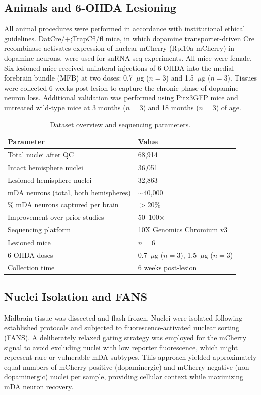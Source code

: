 \documentclass[12pt]{article}
\begin{document}
\subsection{Animals and 6-OHDA Lesioning}

All animal procedures were performed in accordance with institutional ethical guidelines. DatCre/+;TrapCfl/fl mice, in which dopamine transporter-driven Cre recombinase activates expression of nuclear mCherry (Rpl10a-mCherry) in dopamine neurons, were used for snRNA-seq experiments. All mice were female. Six lesioned mice received unilateral injections of 6-OHDA into the medial forebrain bundle (MFB) at two doses: 0.7~$\mu$g ($n = 3$) and 1.5~$\mu$g ($n = 3$). Tissues were collected 6 weeks post-lesion to capture the chronic phase of dopamine neuron loss. Additional validation was performed using Pitx3GFP mice and untreated wild-type mice at 3 months ($n = 3$) and 18 months ($n = 3$) of age.

\begin{table}[ht]
\centering
\caption{Dataset overview and sequencing parameters.}
\label{tab:dataset}
\begin{tabular}{ll}
\toprule
Parameter & Value \\
\midrule
Total nuclei after QC & 68,914 \\
Intact hemisphere nuclei & 36,051 \\
Lesioned hemisphere nuclei & 32,863 \\
mDA neurons (total, both hemispheres) & $\sim$40,000 \\
\% mDA neurons captured per brain & $>$20\% \\
Improvement over prior studies & 50--100$\times$ \\
Sequencing platform & 10X Genomics Chromium v3 \\
Lesioned mice & $n = 6$ \\
6-OHDA doses & 0.7~$\mu$g ($n=3$), 1.5~$\mu$g ($n=3$) \\
Collection time & 6 weeks post-lesion \\
\bottomrule
\end{tabular}
\end{table}

\subsection{Nuclei Isolation and FANS}

Midbrain tissue was dissected and flash-frozen. Nuclei were isolated following established protocols and subjected to fluorescence-activated nuclear sorting (FANS). A deliberately relaxed gating strategy was employed for the mCherry signal to avoid excluding nuclei with low reporter fluorescence, which might represent rare or vulnerable mDA subtypes. This approach yielded approximately equal numbers of mCherry-positive (dopaminergic) and mCherry-negative (non-dopaminergic) nuclei per sample, providing cellular context while maximizing mDA neuron recovery.
\end{document}
